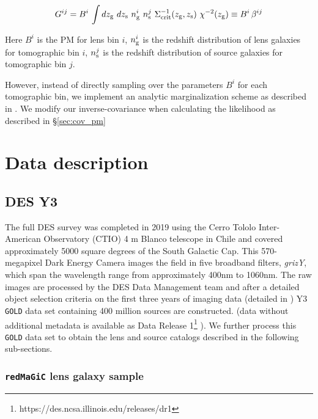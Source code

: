 \documentclass[fleqn,usenatbib]{mnras}
\newcommand{\redmagic}{\texttt{redMaGiC} }
\newcommand{\gold}{\texttt{GOLD} }
\begin{document}
\begin{linenomath*}
\begin{equation}\label{eq:pm_Cij}
    G^{ij} = B^i \, \int dz_{\rm g} \ dz_{\rm s} \ n^{i}_{{\rm g}} \ n^{j}_{{\rm s}} \ \Sigma^{-1}_{\rm crit}(z_{\rm g},z_{\rm s}) \ \chi^{-2}(z_{\rm g}) \equiv B^i \, \beta^{ij}
\end{equation}
\end{linenomath*}
Here $B^i$ is the PM for lens bin $i$, $n^{i}_{{\rm g}}$ is the redshift distribution of lens galaxies for tomographic bin $i$, $n^{j}_{{\rm s}}$ is the redshift distribution of source galaxies for tomographic bin $j$. 

However, instead of directly sampling over the parameters $B^i$ for each tomographic bin, we implement an analytic marginalization scheme as described in \cite{MacCrann:2019ntb}. We modify our inverse-covariance when calculating the likelihood as described in \S\ref{sec:cov_pm}

    

\section{Data description}

\subsection{DES Y3}

The full DES survey was completed in 2019 using the Cerro Tololo Inter-American Observatory (CTIO) 4 m Blanco telescope in Chile and covered approximately 5000 square degrees of the South Galactic Cap. This 570- megapixel Dark Energy Camera \citep{Flaugher15} images the field in five broadband filters, \textit{grizY}, which span the wavelength range from approximately 400nm to 1060nm. The raw images are processed by the DES Data Management team \citep{Sevilla11, Morganson18} and after a detailed object selection criteria on the first three years of imaging data (detailed in \citet{Abbott_2018}) Y3 \gold data set containing 400 million sources are constructed.  (data without additional metadata is available as Data Release 1\footnote{https://des.ncsa.illinois.edu/releases/dr1} ). We further process this \gold data set to obtain the lens and source catalogs described in the following sub-sections.


\subsubsection{\redmagic lens galaxy sample}
\end{document}
